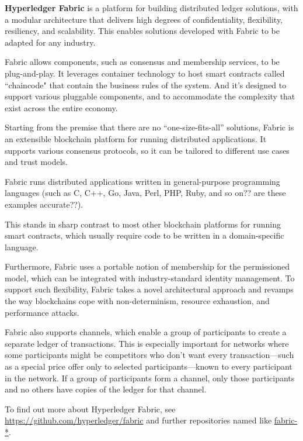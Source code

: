 \textbf{Hyperledger Fabric} is a platform for building distributed ledger solutions, with a modular architecture that delivers high degrees of confidentiality, flexibility, resiliency, and scalability. 
This enables solutions developed with Fabric to be adapted for any industry. 

Fabric allows components, such as consensus and membership services, to be plug-and-play. 
It leverages container technology to host smart contracts called ``chaincode" that contain the business rules of the system. 
And it's designed to support various pluggable components, and to accommodate the complexity that exist across the entire economy.

Starting from the premise that there are no ``one-size-fits-all'' solutions, Fabric is an extensible blockchain platform for running distributed applications. 
It supports various consensus protocols, so it can be tailored to different use cases and trust models. 

Fabric runs distributed applications written in general-purpose programming languages (such as C, C++, Go,  Java, Perl, PHP, Ruby, and so on?? are these examples accurate??).  

This stands in sharp contrast to most other blockchain platforms for running smart contracts, which usually require code to be written in a domain-specific language. 

Furthermore, Fabric uses a portable notion of membership for the permissioned model, which can be integrated with industry-standard identity management.  
To support such flexibility, Fabric takes a novel architectural approach and revamps the way blockchains cope with non-determinism, resource exhaustion, and performance attacks.

Fabric also supports channels, which enable a group of participants to create a separate ledger of transactions. This is especially important for networks where some participants might be competitors who don't want every transaction---such as a special price offer only to selected participants---known to every participant in the network. 
If a group of participants form a channel, only those participants and no others have copies of the ledger for that channel.

To find out more about Hyperledger Fabric, see \url{https://github.com/hyperledger/fabric} and further repositories named like \url{fabric-*}.

